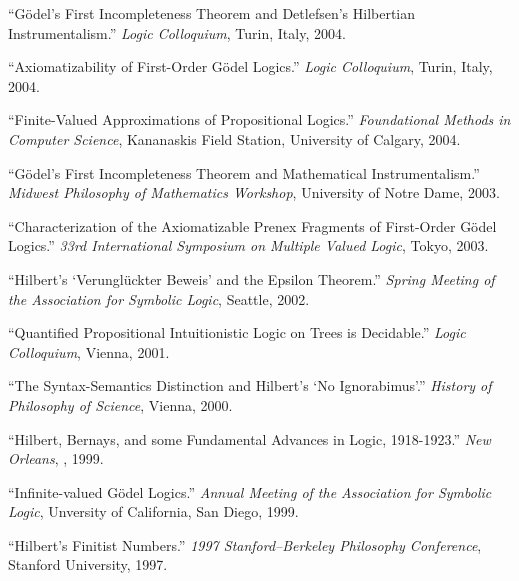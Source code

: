 \documentclass[11pt]{article}
\def\printdate#1{\xprintdate#1-}
\def\xprintdate#1-#2-#3-{#1}
\begin{document}
\ind ``Gödel's First Incompleteness Theorem and Detlefsen's Hilbertian
Instrumentalism.'' \emph{Logic Colloquium}, Turin, Italy, \printdate{2004-00-00}.


\ind ``Axiomatizability of First-Order Gödel Logics.'' \emph{Logic Colloquium}, Turin, Italy, \printdate{2004-00-00}.


\ind ``Finite-Valued Approximations of Propositional Logics.'' \emph{Foundational Methods in Computer Science}, Kananaskis Field Station, University of Calgary, \printdate{2004-06-04}.




\ind ``Gödel's First Incompleteness Theorem and Mathematical Instrumentalism.'' \emph{Midwest Philosophy of Mathematics Workshop}, University of Notre Dame, \printdate{2003-11-22}.


\ind ``Characterization of the Axiomatizable Prenex Fragments of First-Order
Gödel Logics.'' \emph{33rd International Symposium on Multiple Valued Logic}, Tokyo, \printdate{2003-05-30}.






\ind ``Hilbert's `Verunglückter Beweis' and the Epsilon Theorem.'' \emph{Spring Meeting of the Association for Symbolic Logic}, Seattle, \printdate{2002-03-28}.




\ind ``Quantified Propositional Intuitionistic Logic on Trees is Decidable.'' \emph{Logic Colloquium}, Vienna, \printdate{2001-08-08}.









\ind ``The Syntax-Semantics Distinction and Hilbert's `No Ignorabimus'.'' \emph{History of Philosophy of Science}, Vienna, \printdate{2000-07-09}.









\ind ``Hilbert, Bernays, and some Fundamental Advances in Logic, 1918-1923.'' \emph{New Orleans}, , \printdate{1999-05-07}.


\ind ``Infinite-valued Gödel Logics.'' \emph{Annual Meeting of the Association for Symbolic Logic}, Unversity of California, San Diego, \printdate{1999-03-22}.





\ind ``Hilbert's Finitist Numbers.'' \emph{1997 Stanford--Berkeley Philosophy Conference}, Stanford University, \printdate{1997-04-26}.
\end{document}
